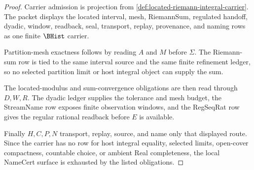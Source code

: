\begin{proof}
Carrier admission is projection from \autoref{def:located-riemann-integral-carrier}. The packet displays the located interval, mesh, RiemannSum, regulated handoff, dyadic, window, readback, seal, transport, replay, provenance, and naming rows as one finite $\BHist$ carrier.

Partition-mesh exactness follows by reading $A$ and $M$ before $\Sigma$. The Riemann-sum row is tied to the same interval source and the same finite refinement ledger, so no selected partition limit or host integral object can supply the sum.

The located-modulus and sum-convergence obligations are then read through $D,W,R$. The dyadic ledger supplies the tolerance and mesh budget, the StreamName row exposes finite observation windows, and the RegSeqRat row gives the regular rational readback before $E$ is available.

Finally $H,C,P,N$ transport, replay, source, and name only that displayed route. Since the carrier has no row for host integral equality, selected limits, open-cover compactness, countable choice, or ambient Real completeness, the local NameCert surface is exhausted by the listed obligations.
\end{proof}




